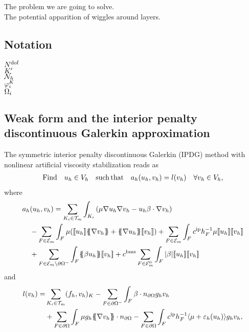The problem we are going to solve.\\

The potential apparition of wiggles around layers.\\

\subsection{Notation}

${N^{\rm dof}}$\\
${K'}$\\
$\mathcal{N}_h$\\
$\varphi_{i}^{K}$\\
$\Omega_i$\\



\subsection{Weak form and the interior penalty discontinuous Galerkin approximation}
The symmetric interior penalty discontinuous Galerkin (IPDG) method with nonlinear artificial viscosity stabilization reads as
\begin{align}\label{eq-dscrtpbm}
{\rm Find}\quad u_h\in V_h \quad {\rm such}\,{\rm that }\quad a_h(u_h,v_h) = l(v_h) \quad \forall v_h\in V_h,
\end{align}
where 
\begin{align}\label{eq-bform}
\begin{split}
a_h&(u_h,v_h) =  \displaystyle\sum\limits_{\elem \in \thm} \int_\elem\left( \mu   \nabla u_h \nabla v_h - 
u_h  \beta \cdot \nabla v_h\right) \\
& - \sum\limits_{F\in \setfaces}  \int_{F} \mu (\jump{u_h}\mean{ \nabla v_h} + \mean{\nabla u_h} \jump{v_h})    +  \sum\limits_{F\in \setfaces}  \int_{F} c^{\rm ip} {h}_F^{-1} \mu\jump{  u_h}\jump{  v_h}   \\
&+ \sum\limits_{F\in \setfaces{ \setminus\partial\Omega^-}}  \int_{F}   \mean{\beta u_h}\jump{v_h} + c^{{\rm bms}} \sum\limits_{F\in \setintfaces}  \int_{F}  |\beta|  \jump{u_h} \jump{v_h} %
\end{split}
\end{align}
and 
\begin{align}\label{eq-rhs}
\begin{split}
l(v_h) = & \displaystyle\sum\limits_{{K_i} \in \mathcal{T}_m} (f_h,v_h)_K - \sum\limits_{F\in\partial \Omega^-}\int_{F} \beta \cdot n_{\partial\Omega}g_h v_h  \\
& +\sum\limits_{F\in \partial \Omega}\int_F \mu g_h \{\! \!\{  \nabla v_h\}\! \!\} \cdot n_{\partial\Omega}
-\sum\limits_{F\in \partial \Omega}\int_F c^{\rm ip} h_F^{-1} \langle\mu+\varepsilon_h(u_h)\rangle g_h v_h , 
\end{split}
\end{align}

